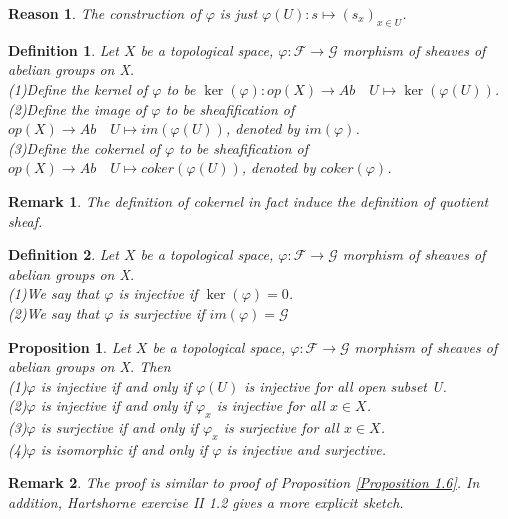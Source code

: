 \documentclass{ctexart}
\newtheorem{definition}{Definition}[section]
\newtheorem{remark}{Remark}[section]
\newtheorem{proposition}{Proposition}[section]
\newtheorem{reason}{Reason}[section]
\begin{document}
\begin{reason}
    The construction of $\varphi$ is just $\varphi(U): s \longmapsto (s_{x})_{x\in U}$.
\end{reason}
\begin{definition}
    Let $X$ be a topological space, $\varphi: \mathcal{F} \longrightarrow \mathcal{G}$ morphism of sheaves of abelian groups on X. \\
    (1)Define the kernel of $\varphi$ to be $\ker(\varphi): op(X) \longrightarrow Ab\quad U \longmapsto \ker(\varphi(U))$. \\
    (2)Define the image of $\varphi$ to be sheafification of $op(X) \longrightarrow Ab\quad U \longmapsto im(\varphi(U))$, denoted by $im(\varphi)$. \\
    (3)Define the cokernel of $\varphi$ to be sheafification of $op(X) \longrightarrow Ab\quad U \longmapsto coker(\varphi(U))$, denoted by $coker(\varphi)$.
\end{definition}
\begin{remark}
    The definition of cokernel in fact induce the definition of quotient sheaf.
\end{remark}
\begin{definition}
    Let $X$ be a topological space, $\varphi: \mathcal{F} \longrightarrow \mathcal{G}$ morphism of sheaves of abelian groups on X. \\
    (1)We say that $\varphi$ is injective if $\ker(\varphi) = 0$. \\
    (2)We say that $\varphi$ is surjective if $im(\varphi) = \mathcal{G}$
\end{definition}
\begin{proposition}
    Let $X$ be a topological space, $\varphi: \mathcal{F} \longrightarrow \mathcal{G}$ morphism of sheaves of abelian groups on X.
    Then \\
    (1)$\varphi$ is injective if and only if $\varphi(U)$ is injective for all open subset U. \\
    (2)$\varphi$ is injective if and only if $\varphi_{x}$ is injective for all $x\in X$. \\
    (3)$\varphi$ is surjective if and only if $\varphi_{x}$ is surjective for all $x\in X$. \\
    (4)$\varphi$ is isomorphic if and only if $\varphi$ is injective and surjective.
    \label{Proposition 1.8}
\end{proposition}
\begin{remark}
    The proof is similar to proof of Proposition \ref{Proposition 1.6}.
    In addition, Hartshorne exercise II 1.2 gives a more explicit sketch.
\end{remark}
\end{document}
